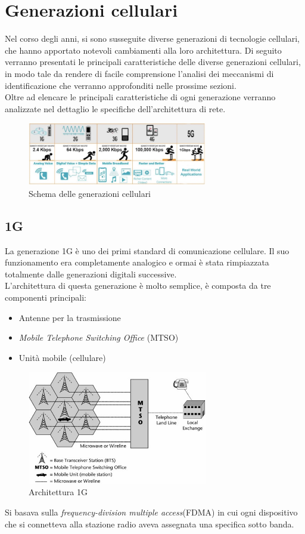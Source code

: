 \section{Generazioni cellulari}
Nel corso degli anni, si sono susseguite diverse generazioni di tecnologie cellulari, che hanno apportato
notevoli cambiamenti alla loro architettura. Di seguito verranno presentati le principali caratteristiche
delle diverse generazioni cellulari, in modo tale da rendere di facile comprensione l'analisi dei meccanismi
di identificazione che verranno approfonditi nelle prossime sezioni.\\
Oltre ad elencare le principali caratteristiche di ogni generazione verranno analizzate nel dettaglio le specifiche  
dell'architettura di rete.
\begin{figure}[ht]
    \centering
    \includegraphics[width=0.7\textwidth]{images/generations-scheme.jpg}
    \caption{Schema delle generazioni cellulari}
\end{figure}

\subsection{1G}
La generazione 1G è uno dei primi standard di comunicazione cellulare. Il suo funzionamento era completamente analogico 
e ormai è stata rimpiazzata totalmente dalle generazioni digitali successive.\\
L'architettura di questa generazione è molto semplice, è composta da tre componenti principali:
\begin{itemize}
    \item Antenne per la trasmissione
    \item \textit{Mobile Telephone Switching Office} (MTSO)
    \item Unità mobile (cellulare)
\end{itemize}
\begin{figure}[ht]
    \centering
    \includegraphics[width=0.7\textwidth]{images/1g.jpg}
    \caption{Architettura 1G}
\end{figure}
Si basava sulla \textit{frequency-division multiple access}(FDMA) in cui ogni dispositivo che si connetteva alla stazione radio
aveva assegnata una specifica sotto banda\cite{generations}.

